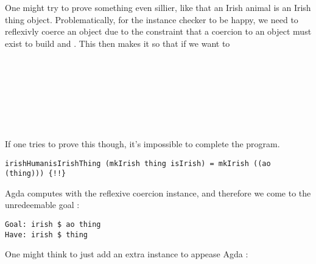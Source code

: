One might try to prove something even sillier, like that an Irish animal is an
Irish thing object. Problematically, for the instance checker to be happy, we need to reflexivly coerce an object due to the constraint that a coercion to an object must exist to build and . This then makes it so that if we want to 

\begin{code}%
\>[0]\<%
\\
\>[0][@{}l@{\AgdaIndent{0}}]%
\>[2]\AgdaSpace{}%
\AgdaSymbol{:}\AgdaSpace{}%
\AgdaSpace{}%
\AgdaSpace{}%
\<%
\\
\>[0]\<%
\\
\>[0][@{}l@{\AgdaIndent{0}}]%
\>[2]\AgdaSpace{}%
\AgdaSymbol{=}\AgdaSpace{}%
\AgdaSpace{}%
\AgdaSpace{}%
\<%
\\
%
\\[\AgdaEmptyExtraSkip]%
\>[0]\<%
\\
\>[0][@{}l@{\AgdaIndent{0}}]%
\>[2]\AgdaSpace{}%
\AgdaSymbol{:}\AgdaSpace{}%
\AgdaSpace{}%
\AgdaSpace{}%
\AgdaSpace{}%
\AgdaSpace{}%
\<%
\end{code}

If one tries to prove this though, it's impossible to complete the program.

\begin{verbatim}
irishHumanisIrishThing (mkIrish thing isIrish) = mkIrish ((ao (thing))) {!!}
\end{verbatim}

Agda computes with the reflexive coercion instance, and therefore we come to the unredeemable goal :

\begin{verbatim}
Goal: irish $ ao thing
Have: irish $ thing
\end{verbatim}

One might think to just add an extra instance to appease Agda :

\begin{code}%
\>[0]\<%
\\
\>[0][@{}l@{\AgdaIndent{0}}]%
\>[2]\AgdaSpace{}%
\AgdaSymbol{=}\AgdaSpace{}%
\AgdaSpace{}%
\AgdaSpace{}%
\AgdaSpace{}%
\AgdaSpace{}%
\<%
\end{code}


